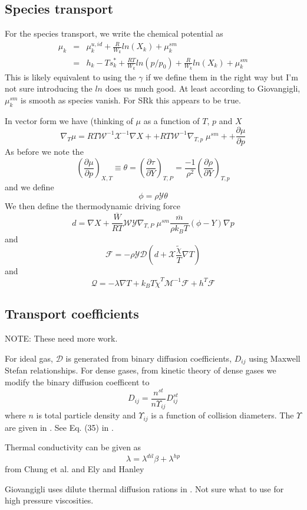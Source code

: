\documentclass[11pt]{article}
\newcommand{\HeatFlux}{\boldsymbol{\mathcal{Q}}}
\newcommand{\SpeciesFlux}{\boldsymbol{\mathcal{F}}}
\newcommand{\mbar}{\overline{m}}
\begin{document}
\subsection{Species transport}

For the species transport, we write the chemical potential as
\begin{eqnarray}
\mu_k &=& \mu_k^{u,id} + \frac{R}{W_k} ln(X_k)  +  \mu_k^{sm} \\
 &=& h_k - T s_k^* + \frac{R T}{W_k} ln(p/p_0) + \frac{R}{W_k} ln(X_k) + \mu_k^{sm}
\end{eqnarray}
This is likely equivalent to using the $\gamma$ if we define them in the right way but I'm not sure
introducing the $ln$ does us much good.
At least according to Giovangigli, $\mu_k^{sm}$ is smooth as species vanish.  For SRk this appears to be true.

In vector form we have (thinking of $\mu$ as a function of $T$, $p$ and $X$
\begin{equation}
\nabla_T \mu
= R T \mathcal{W}^{-1} \mathcal{X}^{-1} \nabla X +
+ R T \mathcal{W}^{-1} \nabla_{T,p} \; \mu^{sm} +
+ \frac{\partial \mu}{\partial p}
\end{equation}
As before we note the
\[
\left(\frac{\partial \mu}{\partial p}\right)_{X,T} \equiv \theta = \left(\frac{ \partial \tau}{\partial Y}\right)_{T,P}
 =
\frac{-1}{\rho^2}\left (\frac{\partial \rho}{\partial Y} \right)_{T,p}
\]
and we define
\[
\phi = \rho \mathcal{Y} \theta
\]
We then define the thermodynamic driving force
\[
d = \nabla X  + \frac{\overline{W}}{R T} \mathcal{W} \mathcal{Y} \nabla_{T,P} \; \mu^{sm}  \frac{\mbar}{\rho k_B T} (\phi - Y) \nabla p
\]
and
\[
\mathcal{F} = - \rho \mathcal{Y} \mathcal{D} ( d + \mathcal{X} \frac{ \tilde{\chi}}{T} \nabla T)
\]
and
\[
\HeatFlux = - \lambda \nabla T + k_B T {\tilde{\chi}}^T \mathcal{M}^{-1} \SpeciesFlux + h^T \SpeciesFlux
\]

\subsection{Transport coefficients}

NOTE:  These need more work.

For ideal gas, $\mathcal{D}$ is generated from binary diffusion coefficients, $D_{ij}$ using
Maxwell Stefan relationships.
For dense gases, from kinetic theory of dense gases we modify the binary diffusion coefficent to
\[
D_{ij} = \frac{n^{st}}{n \Upsilon_{ij}} D_{ij}^{st}
\]
where $n$ is total particle density and $\Upsilon_{ij}$ is a function of collision diameters.
The $\Upsilon$ are given in \cite{KurochkinETAL:1984}.
See Eq. (35) in \cite{giovangigli_CTM:2011}.

Thermal conductivity can be given as
\[
\lambda = \lambda^{dil} \beta + \lambda^{hp}
\]
from Chung et al. \cite{chung:1988} and Ely and Hanley \cite{ElyHanley:1983}

Giovangigli uses dilute thermal diffusion rations in 
\cite{giovangigli_CTM:2011}.
Not sure what to use for high pressure viscosities.



\end{document}
